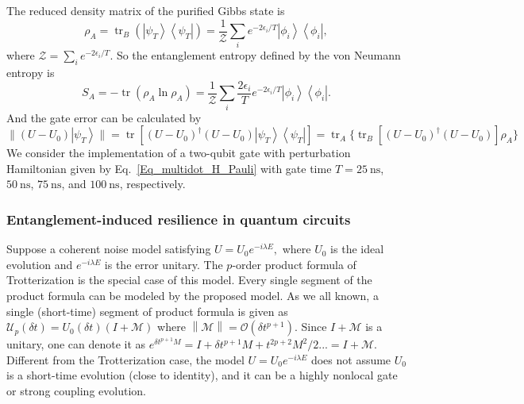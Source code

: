 \documentclass[12pt]{article}
\newcommand{\ket}[1]{\left|#1\right\rangle}
\newcommand{\bra}[1]{\left\langle #1\right|}
\newcommand{\norm}[1]{\left\lVert #1\right\rVert}
\newcommand{\mc}{\mathcal}
\newcommand{\tr}{\operatorname{tr}}
\begin{document}
The reduced density matrix of the purified Gibbs state is 
\begin{equation}
    \rho_A=\tr_B(\ket{\psi_T}\bra{\psi_T})=\dfrac1{\mathcal Z}\sum_ie^{-2\epsilon_i/T}\ket{\phi_i}\bra{\phi_i},
\end{equation}
where $\mathcal Z=\sum_ie^{-2\epsilon_i/T}$. So the entanglement entropy defined by the von Neumann entropy is 
\begin{equation}
    S_A=-\tr(\rho_A\ln\rho_A)=\dfrac1{\mathcal Z}\sum_i\dfrac{2\epsilon_i}{T}e^{-2{\epsilon_i/T}}\ket{\phi_i}\bra{\phi_i}.
\end{equation}
And the gate error can be calculated by
\begin{equation}
    \|(U-U_0)\ket{\psi_T}\|=\tr [(U-U_0)^\dagger(U-U_0)\ket{\psi_T}\bra{\psi_T}]=\tr _A\{\tr_B[(U-U_0)^\dagger(U-U_0)]\rho_A\}
\end{equation}
We consider the implementation of a two-qubit gate with perturbation Hamiltonian given by Eq.~\eqref{Eq_multidot_H_Pauli} with gate time $T=25~\mathrm{ns}$, $50~\mathrm{ns}$, $75~\mathrm{ns}$, and $100~\mathrm{ns}$, respectively.






















\subsubsection*{Entanglement-induced resilience in quantum circuits}

Suppose a coherent noise model satisfying $U=U_0 e^{-i\lambda E},$ where $U_0$ is the ideal evolution and $e^{-i\lambda E}$ is the error unitary.
The $p$-order product formula of Trotterization is the special case of this model. Every single segment of the product formula can be modeled by the proposed model.
As we all known, a single (short-time) segment of product formula is given as $\mathscr{U}_p(\delta t)=U_0(\delta t) (I+\mathscr{M})$ where $\norm{\mathscr{M}}=\mc{O}(\delta t^{p+1})$. Since $I+\mathscr{M} $ is a unitary, one can denote it as $e^{\delta t^{p+1} M}=I+\delta t^{p+1}M+t^{2p+2}M^2/2...=I+\mathscr{M}$. Different from the Trotterization case, the model $U=U_0 e^{-i\lambda E}$ does not assume $U_0$ is a short-time evolution (close to identity), and it can be a highly nonlocal gate or strong coupling evolution.
\end{document}

